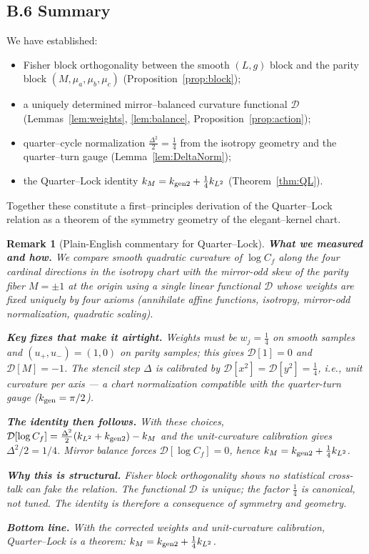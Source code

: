 \documentclass[12pt]{article}
\newtheorem*{remark*}{Remark}
\numberwithin{equation}{section}
\begin{document}
\bigskip
\subsection*{B.6 \; Summary}

We have established:
\begin{itemize}
\item Fisher block orthogonality between the smooth $(L,g)$ block and the parity block $(M,\mu_a,\mu_b,\mu_c)$ (Proposition~\ref{prop:block});
\item a uniquely determined mirror–balanced curvature functional $\mathcal{D}$ (Lemmas~\ref{lem:weights}, \ref{lem:balance}, Proposition~\ref{prop:action});
\item quarter–cycle normalization $\tfrac{\Delta^2}{2}=\tfrac14$ from the isotropy geometry and the quarter–turn gauge (Lemma~\ref{lem:DeltaNorm});
\item the Quarter–Lock identity $k_M=k_{\rm gen2}+\tfrac14 k_{L^2}$ (Theorem~\ref{thm:QL}).
\end{itemize}
Together these constitute a first–principles derivation of the Quarter–Lock relation as a theorem of the symmetry geometry of the elegant–kernel chart.

\begin{remark*}[Plain-English commentary for Quarter–Lock]
\textbf{What we measured and how.}
We compare \emph{smooth} quadratic curvature of $\log C_f$ along the four cardinal directions in the isotropy chart with the \emph{mirror-odd} skew of the parity fiber $M=\pm1$ at the origin using a single linear functional $\mathcal{D}$ whose weights are fixed uniquely by four axioms (annihilate affine functions, isotropy, mirror-odd normalization, quadratic scaling).

\textbf{Key fixes that make it airtight.}
Weights must be $w_j=\tfrac14$ on smooth samples and $(u_+,u_-)=(1,0)$ on parity samples; this gives $\mathcal{D}[1]=0$ and $\mathcal{D}[M]=-1$. The stencil step $\Delta$ is calibrated by $\mathcal{D}[x^2]=\mathcal{D}[y^2]=\tfrac14$, i.e., unit curvature per axis — a chart normalization compatible with the quarter-turn gauge ($k_{\rm gen}=\pi/2$).

\textbf{The identity then follows.}
With these choices, $\mathcal{D}[\log C_f]=\frac{\Delta^2}{2}(k_{L^2}+k_{\rm gen2})-k_M$ and the unit-curvature calibration gives $\Delta^2/2=1/4$. Mirror balance forces $\mathcal{D}[\log C_f]=0$, hence $k_M=k_{\rm gen2}+\tfrac14 k_{L^2}$.

\textbf{Why this is structural.}
Fisher block orthogonality shows no statistical cross-talk can fake the relation. The functional $\mathcal{D}$ is unique; the factor $\tfrac14$ is canonical, not tuned. The identity is therefore a consequence of symmetry and geometry.

\textbf{Bottom line.}
With the corrected weights and unit-curvature calibration, Quarter–Lock is a \emph{theorem}: $k_M=k_{\rm gen2}+\tfrac14 k_{L^2}$.
\end{remark*}
\end{document}
